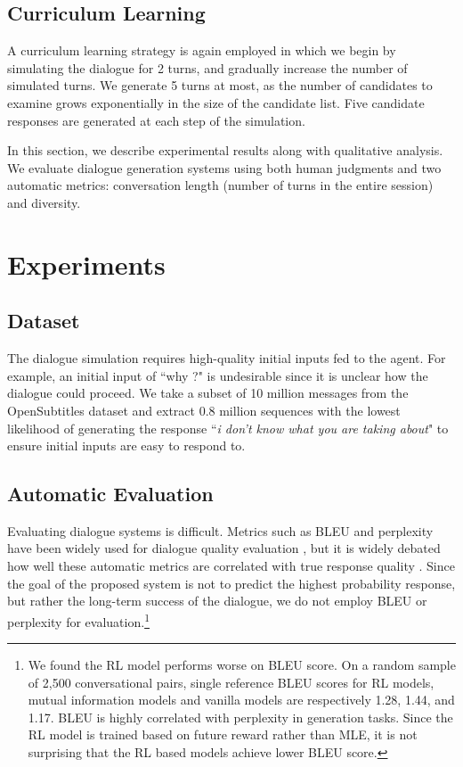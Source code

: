 \subsection{Curriculum Learning}
A curriculum learning strategy is again employed  in which we begin by simulating the dialogue for 2 turns, and gradually increase the number of simulated turns. 
We generate 5 turns at most, as  the number of candidates to examine grows exponentially in the size of the candidate list.
Five candidate responses are generated at each step of the simulation.



In this section, we  describe experimental results along with qualitative analysis.  We evaluate dialogue generation systems using both human judgments and
two automatic metrics: conversation length (number of turns in the entire session) and diversity.
\section{Experiments}
\subsection{Dataset}
The dialogue simulation requires  high-quality initial inputs fed to the agent. For example, an initial input of ``why ?" is undesirable since it is unclear how the dialogue could proceed. 
We take a subset of 10 million messages from the OpenSubtitles dataset and extract 0.8 million sequences with the lowest likelihood of generating the response
``{\it i don't know what you are taking about}" to ensure initial inputs are easy to respond to.


\subsection{Automatic Evaluation}
Evaluating dialogue systems is difficult. Metrics such as BLEU
\cite{papineni2002bleu} and perplexity have been widely used for
dialogue quality evaluation
\cite{li2015diversity,vinyals2015neural,sordoni2015neural}, but it
is widely debated how well these automatic metrics are correlated
with true response quality \cite{galley2015deltableu}.
Since the goal of the proposed system is not to predict the highest probability response, but rather the long-term success of the dialogue, 
we do not employ BLEU or perplexity for evaluation.\footnote{We found the RL model performs worse on BLEU score. On a random sample of 2,500 conversational pairs, single reference BLEU scores for RL models, mutual information models and vanilla \sts models  are respectively 1.28, 1.44, and 1.17.  BLEU is highly correlated with perplexity in generation tasks. Since the RL model is trained based on future reward rather than MLE, it is not surprising that the RL based models achieve lower BLEU score.}

